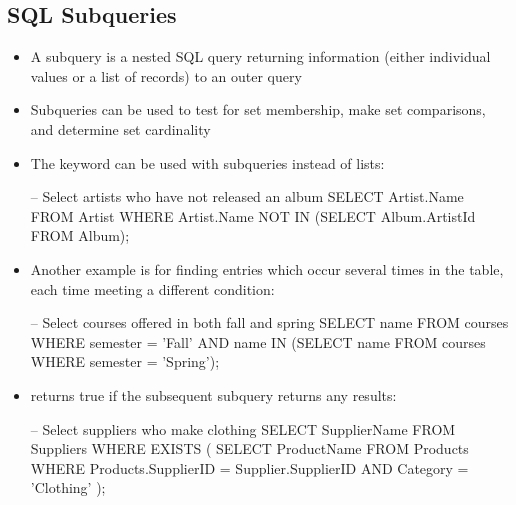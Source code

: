 \documentclass[a4paper]{article}
\begin{document}
\subsection{SQL Subqueries}
\begin{itemize}
    \item A subquery is a nested SQL query returning information (either individual values or a list of records) to an outer query
    \item Subqueries can be used to test for set membership, make set comparisons, and determine set cardinality
    \item The  keyword can be used with subqueries instead of lists:
\begin{sql}
-- Select artists who have not released an album
SELECT Artist.Name FROM Artist
WHERE Artist.Name NOT IN
(SELECT Album.ArtistId FROM Album);
\end{sql}
    \item Another example is for finding entries which occur several times in the table, each time meeting a different condition:
\begin{sql}
-- Select courses offered in both fall and spring
SELECT name FROM courses
WHERE semester = 'Fall'
AND name IN
(SELECT name FROM courses
WHERE semester = 'Spring');
\end{sql}
\item {} returns true if the subsequent subquery returns any results:
\begin{sql}
-- Select suppliers who make clothing
SELECT SupplierName FROM Suppliers
WHERE EXISTS (
    SELECT ProductName FROM Products
    WHERE Products.SupplierID = Supplier.SupplierID
    AND Category = 'Clothing'
);
\end{sql}
\end{itemize}
\end{document}
